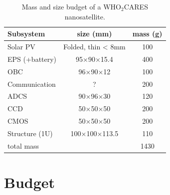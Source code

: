 \documentclass{scrartcl}
\begin{document}
\begin{table}
    \centering
    \caption{Mass and size budget of a WHO$_2$CARES nanosatellite.}
    \begin{tabular}{lcS}
        \toprule
        Subsystem      & size (mm)          & {mass (g)}\\
        \midrule
        Solar PV       & Folded, thin < 8mm & 100\\
        EPS (+battery) & 95×90×15.4         & 400\\
        OBC            & 96×90×12           & 100\\
        Communication  & ?                 & 200\\
        ADCS           & 90×96×30           & 120\\
        CCD            & 50×50×50           & 200\\
        CMOS           & 50×50×50           & 200\\
        Structure (1U) & 100×100×113.5      & 110\\
        \midrule
        total mass     &                    & 1430\\
        \bottomrule
    \end{tabular}
    \label{tab:payload}
\end{table}


\section{Budget}

\end{document}
